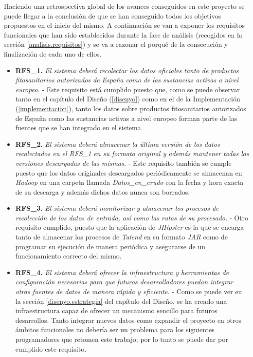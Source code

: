  Haciendo una retrospectiva global de los avances conseguidos en este proyecto se puede llegar a la conclusión de que se han conseguido todos los objetivos propuestos en el inicio del mismo. A continuación se van a exponer los requisitos funcionales que han sido establecidos durante la fase de análisis (recogidos en la sección \ref{analisis.requisitos}) y se va a razonar el porqué de la consecución y finalización de cada uno de ellos. 
 \begin{itemize}
 \item \textbf{RFS\_1. } \textit{El sistema deberá recolectar los datos oficiales tanto de productos fitosanitarios autorizados de España como de las sustancias activas a nivel europeo.} - Este requisito está cumplido puesto que, como se puede observar tanto en el capítulo del Diseño (\ref{disenyo}) como en el de la Implementación (\ref{implementacion}), tanto los datos sobre productos fitosanitarios autorizados de España como las sustancias activas a nivel europeo forman parte de las fuentes que se han integrado en el sistema.
 \item \textbf{RFS\_2. } \textit{El sistema deberá almacenar la última versión de los datos recolectados en el RFS\_1 en su formato original y además mantener todas las versiones descargadas de las mismas.} - Este requisito también se cumple puesto que los datos originales descargados periódicamente se almacenan en \textit{Hadoop} en una carpeta llamada \textit{Datos\_en\_crudo} con la fecha y hora exacta de su descarga y además dichos datos nunca son borrados. 
 \item \textbf{RFS\_3. } \textit{El sistema deberá monitorizar y almacenar los procesos de recolección de los datos de entrada, así como las rutas de su procesado.} - Otro requisito cumplido, puesto que la aplicación de \textit{JHipster} es la que se encarga tanto de almacenar los procesos de \textit{Talend} en su formato \textit{JAR} como de programar su ejecución de manera periódica y asegurarse de un funcionamiento correcto del mismo.  
 \item \textbf{RFS\_4. } \textit{El sistema deberá ofrecer la infraestructura y herramientas de configuración necesarias para que futuros desarrolladores puedan integrar otras fuentes de datos de manera rápida y eficiente.} - Como se puede ver en la sección \ref{disenyo.estrategia} del capítulo del Diseño, se ha creado una infraestructura capaz de ofrecer un mecanismo sencillo para futuros desarrollos. Tanto integrar nuevos datos como expandir el proyecto en otros ámbitos funcionales no debería ser un problema para los siguientes programadores que retomen este trabajo; por lo tanto se puede dar por cumplido este requisito. 

\end{itemize}
